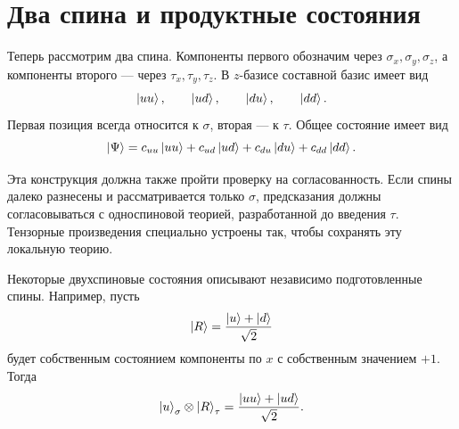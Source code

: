 \begin{classroomqa}
\end{classroomqa}

\section{Два спина и продуктные состояния}

Теперь рассмотрим два спина. Компоненты первого обозначим через \(\sigma_x,\sigma_y,\sigma_z\), а компоненты второго — через \(\tau_x,\tau_y,\tau_z\). В \(z\)-базисе составной базис имеет вид
\begin{equation}
\left\lvert uu\right\rangle,\qquad \left\lvert ud\right\rangle,\qquad \left\lvert du\right\rangle,\qquad \left\lvert dd\right\rangle.
\label{eq:l6-two-spin-basis}
\end{equation}
Первая позиция всегда относится к \(\sigma\), вторая — к \(\tau\). Общее состояние имеет вид
\begin{equation}
\left\lvert\Psi\right\rangle
=c_{uu}\left\lvert uu\right\rangle+c_{ud}\left\lvert ud\right\rangle
+c_{du}\left\lvert du\right\rangle+c_{dd}\left\lvert dd\right\rangle.
\label{eq:l6-general-two-spin}
\end{equation}

\begin{classroomqa}
\end{classroomqa}

Эта конструкция должна также пройти проверку на согласованность. Если спины далеко разнесены и рассматривается только \(\sigma\), предсказания должны согласовываться с односпиновой теорией, разработанной до введения \(\tau\). Тензорные произведения специально устроены так, чтобы сохранять эту локальную теорию.

Некоторые двухспиновые состояния описывают независимо подготовленные спины. Например, пусть
\begin{equation}
\left\lvert R\right\rangle=\frac{\left\lvert u\right\rangle+\left\lvert d\right\rangle}{\sqrt2}
\end{equation}
будет собственным состоянием компоненты по \(x\) с собственным значением \(+1\). Тогда
\begin{equation}
\left\lvert u\right\rangle_{\sigma}\otimes\left\lvert R\right\rangle_{\tau}
=\frac{\left\lvert uu\right\rangle+\left\lvert ud\right\rangle}{\sqrt2}.
\label{eq:l6-up-right-product}
\end{equation}

